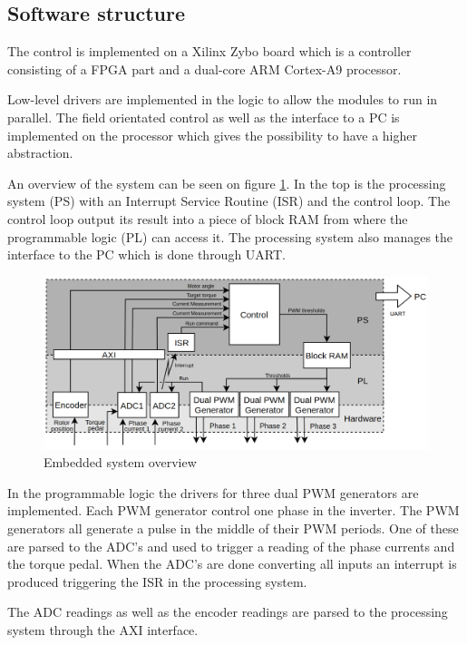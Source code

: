 \subsection{Software structure}
The control is implemented on a Xilinx Zybo board which is a controller consisting of a FPGA part and a dual-core ARM Cortex-A9 processor.

Low-level drivers are implemented in the logic to allow the modules to run in parallel. The field orientated control as well as the interface to a PC is implemented on the processor which gives the possibility to have a higher abstraction. 

An overview of the system can be seen on figure \ref{fig:embedded_overview}. In the top is the processing system (PS) with an Interrupt Service Routine (ISR) and the control loop. The control loop output its result into a piece of block RAM from where the programmable logic (PL) can access it. The processing system also manages the interface to the PC which is done through UART.

\begin{figure}[H]
	\centering
	\includegraphics[width=1\linewidth]{pictures/software/embedded_overview.png}
	\caption{Embedded system overview}
	\label{fig:embedded_overview}
\end{figure}


In the programmable logic the drivers for three dual PWM generators are implemented. Each PWM generator control one phase in the inverter. The PWM generators all generate a pulse in the middle of their PWM periods. One of these are parsed to the ADC's and used to trigger a reading of the phase currents and the torque pedal. When the ADC's are done converting all inputs an interrupt is produced triggering the ISR in the processing system.

The ADC readings as well as the encoder readings are parsed to the processing system through the AXI interface.



